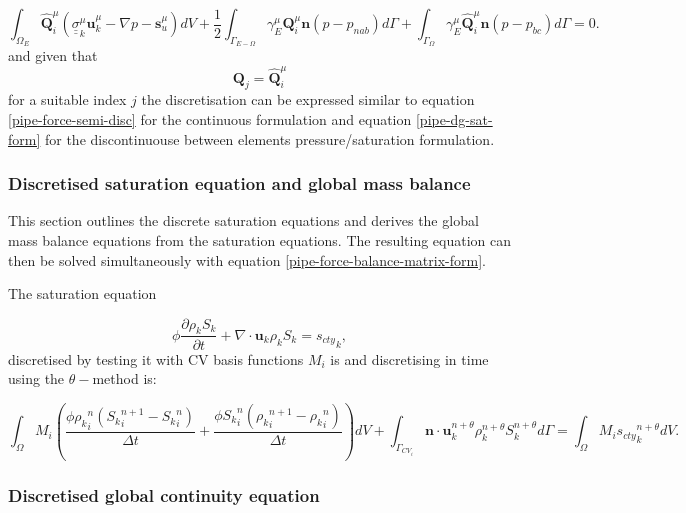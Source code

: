\begin{equation}
\int_{\Omega_E} \hat{\mathbf Q}_i^\mu ({\underline{\underline{\sigma}}}_k^\mu {\mathbf u}_k^\mu - \nabla p -{\mathbf s}_u^\mu) dV
+  \frac{1}{2}\int_{\Gamma_{E-\Omega}} \gamma^\mu_E {\mathbf Q}_i^\mu {\mathbf n} (p - p_{nab}) d\Gamma
+  \int_{\Gamma_{\Omega}}  \gamma^\mu_E \hat{\mathbf Q}_i^\mu {\mathbf n} (p - p_{bc}) d\Gamma =0.
\label{pipe-overlap-eqn-dg}
\end{equation}
and given that
\begin{equation}
{\mathbf Q}_j=\hat{\mathbf Q}_i^\mu
\end{equation}
for a suitable index $j$ the discretisation can be expressed
similar to equation \ref{pipe-force-semi-disc} for the continuous formulation and
equation \ref{pipe-dg-sat-form} for the discontinuouse
between elements pressure/saturation formulation.




\subsubsection{Discretised saturation equation and global mass balance}

This section outlines the discrete saturation equations and derives the global mass balance equations from the saturation equations. The resulting equation can then be solved simultaneously with equation \ref{pipe-force-balance-matrix-form}.


The saturation equation

\begin{equation}
\phi\frac{\partial \rho_k S_k }{\partial t}
+ \nabla \cdot {\mathbf u}_k \rho_k S_k = {s_{cty}}_k,
\end{equation}
discretised by testing it with CV basis functions
 $M_i$ is and discretising in time using the
 $\theta-$method is:

\begin{equation}
\int_\Omega M_i (\frac{\phi{\rho_k}_i^n ({S_k}_i^{n+1}-{S_k}_i^n) }{\Delta t}
+ \frac{\phi{S_k}_i^n( {\rho_k}_i^{n+1}-{\rho_k}_i^n)} {\Delta t} ) dV
+ \int_{\Gamma_{CV_i}} {\mathbf n} \cdot {\mathbf u}_k^{n+\theta} \rho_k^{n+\theta} S_k^{n+\theta}
d\Gamma
= \int_\Omega M_i {s_{cty}}_k^{n+\theta} dV.
\label{pipe-detail-sat-eqn-k}
\end{equation}


\subsubsection{Discretised global continuity equation}

